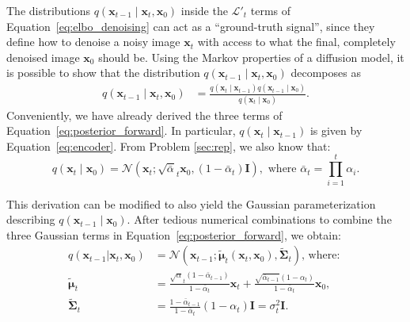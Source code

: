 \documentclass[11pt,addpoints,answers]{exam}
\newcommand{\xv}{\mathbf{x}}
\newcommand{\muv        }{\boldsymbol \mu        }
\begin{document}
\begin{questions}
    The distributions $q(\xv_{t-1} \mid \xv_{t}, \xv_{0})$ inside the $\mathcal{L'}_t$ terms of Equation~\ref{eq:elbo_denoising} can act as a ``ground-truth signal'', since they define how to denoise a noisy image $\xv_t$ with access to what the final, completely denoised image $\xv_0$ should be. Using the Markov properties of a diffusion model, it is possible to show that the distribution $q(\xv_{t-1} \mid \xv_{t}, \xv_{0})$ decomposes as
    \begin{align}
        q(\xv_{t-1} \mid \xv_{t}, \xv_{0}) & =\frac{q(\xv_{t} \mid \xv_{t-1})q(\xv_{t-1} \mid  \xv_{0})}{q(\xv_{t} \mid  \xv_{0})}.
        \label{eq:posterior_forward}
    \end{align}
    Conveniently, we have already derived the three terms of Equation~\ref{eq:posterior_forward}. In particular, $q(\xv_{t} \mid \xv_{t-1})$ is given by Equation~\ref{eq:encoder}. From Problem \ref{sec:rep}, we also know that:
    \begin{equation}
        q(\xv_t \mid  \xv_{0})=\mathcal{N}(\xv_t;\sqrt{\bar{\alpha}}_t \xv_{0},(1-\bar{\alpha}_{t})  \boldsymbol{I}), \text{ where } \bar{\alpha}_t=\prod_{i=1}^{t} \alpha_i.
    \label{eq:encoder_3}
    \end{equation}
    \par
    This derivation can be modified to also yield the Gaussian parameterization describing   $q(\xv_{t-1} \mid  \xv_{0})$. After tedious numerical combinations to combine the three Gaussian terms in Equation~\ref{eq:posterior_forward}, we obtain:
    \begin{equation}
        \begin{aligned}
           q(\xv_{t-1} | \xv_t, \xv_0) &= \mathcal{N}(\xv_{t-1}; \tilde{\muv}_t(\xv_t, \xv_0),\tilde{\boldsymbol{\Sigma}}_t)   \text{, where: } \\
              \tilde{\muv}_t & = {\frac{\sqrt\alpha_t(1 - \bar\alpha_{t-1})}{1 - \bar \alpha_t}} \xv_t + {\frac{\sqrt{\bar\alpha_{t-1}}(1-\alpha_t)}{1 - \bar\alpha_t}} \xv_0, \\
            \tilde{\boldsymbol{\Sigma}}_t & = \frac{1 - \bar \alpha_{t-1}}{1 - \bar \alpha_t} (1-\alpha_t) \boldsymbol{I} = \sigma_t^2 \boldsymbol{I}.
        \end{aligned}
    \end{equation}


\end{questions}
\end{document}
